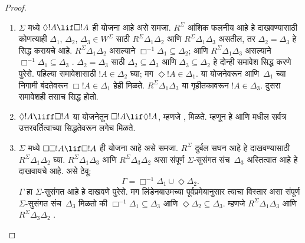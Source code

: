 \documentclass[../../../include/open-logic-section]{subfiles}
\begin{document}
\begin{proof}
  \begin{enumerate}
  \item $\Sigma$ मध्ये
    $\Diamond !A \lif \Box !A$
    ही योजना आहे असे समजा.
    $R^\Sigma$ आंशिक फलनीय आहे हे
    दाखवण्यासाठी कोणत्याही
    $\Delta_1$, $\Delta_2$,
    $\Delta_3 \in W^\Sigma$
    साठी $R^\Sigma \Delta_1\Delta_2$
    आणि $R^\Sigma \Delta_1\Delta_3$
    असतील, तर $\Delta_2=\Delta_3$
    हे सिद्ध करायचे आहे.
    $R^\Sigma \Delta_1\Delta_2$
    असल्याने $\Box^{-1}\Delta_1
    \subseteq \Delta_2$;
    आणि $R^\Sigma \Delta_1\Delta_3$
    असल्याने $\Box^{-1}\Delta_1
    \subseteq \Delta_3$
    .
    $\Delta_2=\Delta_3$ साठी
    $\Delta_2 \subseteq \Delta_3$
    आणि $\Delta_3 \subseteq \Delta_2$
    हे दोन्ही समावेश सिद्ध करणे पुरेसे.
    पहिल्या समावेशासाठी
    $!A \in \Delta_2$ घ्या;
    मग $\Diamond!A \in \Delta_1$.
    या योजनेवरून आणि~$\Delta_1$ च्या
    निगामी बंदतेवरून
    $\Box!A \in \Delta_1$ हेही मिळते.
    $R^\Sigma \Delta_1\Delta_3$
    या गृहीतकावरून $!A \in \Delta_3$.
    दुसरा समावेशही तसाच सिद्ध होतो.

  \item $\Diamond!A \liff \Box!A$ या योजनेतून
    $\Box!A \lif \Diamond!A$, म्हणजे , मिळते.
    म्हणून हे 
    आणि 
    मधील सर्वत्र उत्तरवर्तित्वाच्या
    सिद्धतेवरून लगेच मिळते.

  \item $\Sigma$ मध्ये
    $\Box\Box!A \lif \Box!A$
    ही योजना आहे असे समजा.
    $R^\Sigma$ दुर्बल सघन आहे हे
    दाखवण्यासाठी $R^\Sigma
    \Delta_1\Delta_2$ घ्या.
    $R^\Sigma \Delta_1\Delta_3$
    आणि $R^\Sigma \Delta_3\Delta_2$
    असा संपूर्ण $\Sigma$-सुसंगत
    संच~$\Delta_3$ अस्तित्वात आहे
    हे दाखवायचे आहे. असे ठेवू:
    \[
    \Gamma = \Box^{-1}\Delta_1 \cup \Diamond\Delta_2.
    \]
    $\Gamma$ हा $\Sigma$-सुसंगत
    आहे हे दाखवणे पुरेसे. मग
    लिंडेनबाउमच्या पूर्वप्रमेयानुसार
    त्याचा विस्तार असा संपूर्ण
    $\Sigma$-सुसंगत संच~$\Delta_3$
    मिळतो की $\Box^{-1}\Delta_1
    \subseteq \Delta_3$ आणि
    $\Diamond\Delta_2 \subseteq \Delta_3$.
    म्हणजे $R^\Sigma \Delta_1\Delta_3$
    आणि $R^\Sigma \Delta_3\Delta_2$
    .


\end{enumerate}
\end{proof}
\end{document}
